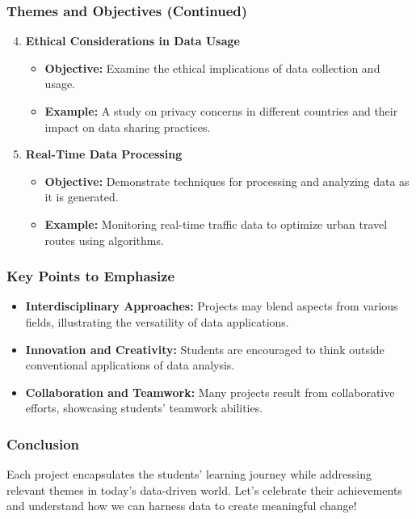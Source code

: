 \documentclass[aspectratio=169]{beamer}
\begin{document}
\begin{frame}[fragile]
    \frametitle{Themes and Objectives (Continued)}
    \begin{enumerate}
        \setcounter{enumi}{3}
        \item \textbf{Ethical Considerations in Data Usage}
        \begin{itemize}
            \item \textbf{Objective:} Examine the ethical implications of data collection and usage.
            \item \textbf{Example:} A study on privacy concerns in different countries and their impact on data sharing practices.
        \end{itemize}
        
        \item \textbf{Real-Time Data Processing}
        \begin{itemize}
            \item \textbf{Objective:} Demonstrate techniques for processing and analyzing data as it is generated.
            \item \textbf{Example:} Monitoring real-time traffic data to optimize urban travel routes using algorithms.
        \end{itemize}
    \end{enumerate}
\end{frame}

\begin{frame}[fragile]
    \frametitle{Key Points to Emphasize}
    \begin{itemize}
        \item \textbf{Interdisciplinary Approaches:} Projects may blend aspects from various fields, illustrating the versatility of data applications.
        \item \textbf{Innovation and Creativity:} Students are encouraged to think outside conventional applications of data analysis.
        \item \textbf{Collaboration and Teamwork:} Many projects result from collaborative efforts, showcasing students' teamwork abilities.
    \end{itemize}
\end{frame}

\begin{frame}[fragile]
    \frametitle{Conclusion}
    Each project encapsulates the students' learning journey while addressing relevant themes in today's data-driven world. Let's celebrate their achievements and understand how we can harness data to create meaningful change!
\end{frame}
\end{document}
